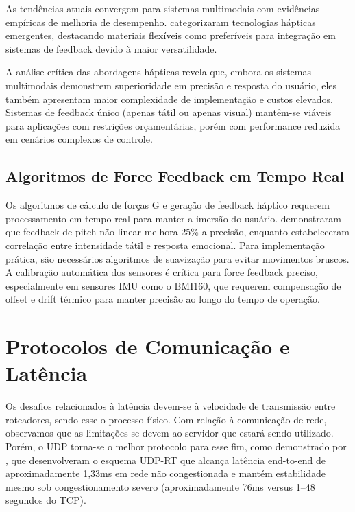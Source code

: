As tendências atuais convergem para sistemas multimodais com evidências empíricas de melhoria de desempenho.  categorizaram tecnologias hápticas emergentes, destacando materiais flexíveis como preferíveis para integração em sistemas de feedback devido à maior versatilidade.

A análise crítica das abordagens hápticas revela que, embora os sistemas multimodais demonstrem superioridade em precisão e resposta do usuário, eles também apresentam maior complexidade de implementação e custos elevados. Sistemas de feedback único (apenas tátil ou apenas visual) mantêm-se viáveis para aplicações com restrições orçamentárias, porém com performance reduzida em cenários complexos de controle.

\subsection{Algoritmos de Force Feedback em Tempo Real}
\label{subsec:algoritmos-feedback-tempo-real}

Os algoritmos de cálculo de forças G e geração de feedback háptico requerem processamento em tempo real para manter a imersão do usuário.  demonstraram que feedback de pitch não-linear melhora 25\% a precisão, enquanto  estabeleceram correlação entre intensidade tátil e resposta emocional. Para implementação prática, são necessários algoritmos de suavização para evitar movimentos bruscos. A calibração automática dos sensores é crítica para force feedback preciso, especialmente em sensores IMU como o BMI160, que requerem compensação de offset e drift térmico para manter precisão ao longo do tempo de operação.

\section{Protocolos de Comunicação e Latência}
\label{sec:protocolos-comunicacao}

Os desafios relacionados à latência devem-se à velocidade de transmissão entre roteadores, sendo esse o processo físico. Com relação à comunicação de rede, observamos que as limitações se devem ao servidor que estará sendo utilizado. Porém, o UDP torna-se o melhor protocolo para esse fim, como demonstrado por , que desenvolveram o esquema UDP-RT que alcança latência end-to-end de aproximadamente 1,33ms em rede não congestionada e mantém estabilidade mesmo sob congestionamento severo (aproximadamente 76ms versus 1--48 segundos do TCP)\@.


